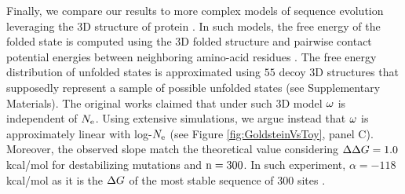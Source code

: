 \documentclass{article}
\begin{document}
Finally, we compare our results to more complex models of sequence evolution leveraging the $3$D structure of protein \cite{Williams2006, Goldstein2011, Pollock2012}.
In such models, the free energy of the folded state is computed using the $3$D folded structure and pairwise contact potential energies between neighboring amino-acid residues \cite{Miyazawa1985}.
The free energy distribution of unfolded states is approximated using $55$ decoy $3$D structures that supposedly represent a sample of possible unfolded states (see Supplementary Materials).
The original works claimed that under such $3$D model $\omega$ is independent of $N_{\mathrm{e}}$.
Using extensive simulations, we argue instead that $\omega$ is approximately linear with log-$N_{\mathrm{e}}$ (see Figure \ref{fig:GoldsteinVsToy}, panel C).
Moreover, the observed slope match the theoretical value considering $\Delta \Delta G = 1.0$ kcal/mol for destabilizing mutations and $\text{n}=300$. 
In such experiment, $\alpha=-118$ kcal/mol as it is the $\Delta G$ of the most stable sequence of $300$ sites \cite{Goldstein2011}.
\end{document}
